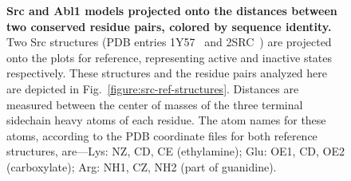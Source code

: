 \documentclass[aps,prl,preprint,nofootinbib,superscriptaddress,linenumbers]{revtex4-1}
\begin{document}
\begin{figure}


    \caption{\footnotesize {\bf Src and Abl1 models projected onto the distances between two conserved residue pairs, colored by sequence identity.}
    Two Src structures (PDB entries 1Y57~\cite{cowan-jacob:2005:1y57} and 2SRC~\cite{xu:1999:2src}) are projected onto the plots for reference, representing active and inactive states respectively.
    These structures and the residue pairs analyzed here are depicted in Fig.~\ref{figure:src-ref-structures}.
    Distances are measured between the center of masses of the three terminal sidechain heavy atoms of each residue.
    The atom names for these atoms, according to the PDB coordinate files for both reference structures, are---Lys: NZ, CD, CE (ethylamine); Glu: OE1, CD, OE2 (carboxylate); Arg: NH1, CZ, NH2 (part of guanidine).
    }
  \label{figure:pair-distances}
\end{figure}
\end{document}
